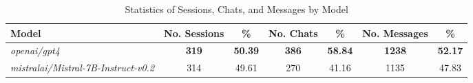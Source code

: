 
\begin{table}[H]
\centering
\scriptsize
\begin{tabular}{@{}lcccccc@{}}
\toprule
Model & No. Sessions & \% & No. Chats & \% & No. Messages & \% \\
\midrule
\textit{openai/gpt4} & \textbf{319} & \textbf{50.39} & \textbf{386} & \textbf{58.84} & \textbf{1238} & \textbf{52.17} \\
\textit{mistralai/Mistral-7B-Instruct-v0.2} & 314 & 49.61 & 270 & 41.16 & 1135 & 47.83 \\

\bottomrule
\end{tabular}
\caption{Statistics of Sessions, Chats, and Messages by Model}
\label{tab:sessions_chats_and_messages_by_model}
\end{table}
